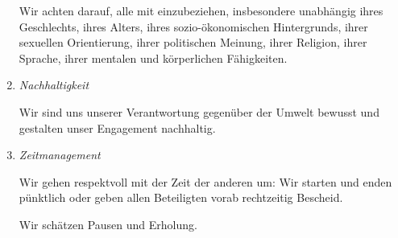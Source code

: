 \begin{enumerate}
    Wir achten darauf, alle mit einzubeziehen, insbesondere unabhängig ihres Geschlechts, ihres Alters, ihres sozio-ökonomischen Hintergrunds, ihrer sexuellen Orientierung, ihrer politischen Meinung, ihrer Religion, ihrer Sprache, ihrer mentalen und körperlichen Fähigkeiten.

    \item \textit{Nachhaltigkeit}

    Wir sind uns unserer Verantwortung gegenüber der Umwelt bewusst und gestalten unser Engagement nachhaltig.

    \item \textit{Zeitmanagement}

    Wir gehen respektvoll mit der Zeit der anderen um: Wir starten und enden pünktlich oder geben allen Beteiligten vorab rechtzeitig Bescheid.

    Wir schätzen Pausen und Erholung.
\end{enumerate}
